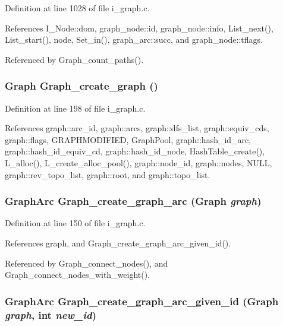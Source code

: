 Definition at line 1028 of file i\_\-graph.c.

References I\_\-Node::dom, graph\_\-node::id, graph\_\-node::info, List\_\-next(), List\_\-start(), node, Set\_\-in(), graph\_\-arc::succ, and graph\_\-node::tflags.

Referenced by Graph\_\-count\_\-paths().
\subsubsection{\setlength{\rightskip}{0pt plus 5cm}\bf{Graph} Graph\_\-create\_\-graph ()}\label{i__graph_8c_a846a24de5258a3c8f2b6e4f343a4fe4}




Definition at line 198 of file i\_\-graph.c.

References graph::arc\_\-id, graph::arcs, graph::dfs\_\-list, graph::equiv\_\-cds, graph::flags, GRAPHMODIFIED, Graph\-Pool, graph::hash\_\-id\_\-arc, graph::hash\_\-id\_\-equiv\_\-cd, graph::hash\_\-id\_\-node, Hash\-Table\_\-create(), L\_\-alloc(), L\_\-create\_\-alloc\_\-pool(), graph::node\_\-id, graph::nodes, NULL, graph::rev\_\-topo\_\-list, graph::root, and graph::topo\_\-list.
\subsubsection{\setlength{\rightskip}{0pt plus 5cm}\bf{Graph\-Arc} Graph\_\-create\_\-graph\_\-arc (\bf{Graph} {\em graph})}\label{i__graph_8c_5f89323adca2a48c1f98f54cdfd2ac3c}




Definition at line 150 of file i\_\-graph.c.

References graph, and Graph\_\-create\_\-graph\_\-arc\_\-given\_\-id().

Referenced by Graph\_\-connect\_\-nodes(), and Graph\_\-connect\_\-nodes\_\-with\_\-weight().
\subsubsection{\setlength{\rightskip}{0pt plus 5cm}\bf{Graph\-Arc} Graph\_\-create\_\-graph\_\-arc\_\-given\_\-id (\bf{Graph} {\em graph}, int {\em new\_\-id})}\label{i__graph_8c_c8565f77e3e329b5e006cc410ae0967c}




